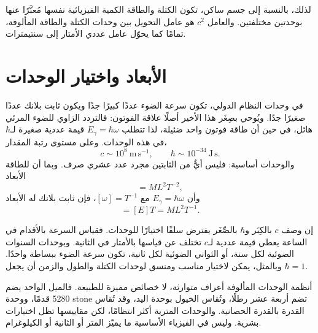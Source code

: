 لذلك، بالنسبة إلى جسم ساكن، تكون الكتلة والطاقة الكمية الفيزيائية نفسها مُعبَّرًا عنها بوحدتين مختلفتين. والعامل \(c^2\) هو عامل التحويل بين وحدات الكتلة والطاقة المألوفة، تمامًا كما يحوّل عامل عددي الأمتار إلى سنتيمترات.

\begin{classroomqa}
\end{classroomqa}

\section{الأبعاد واختيار الوحدات}

في وحدات النظام الدولي، تكون سرعة الضوء عددًا كبيرًا جدًا ويكون ثابت بلانك عددًا صغيرًا جدًا. ويُوحي بصِغَر هذا الأخير أصلًا علاقة الفوتون: فالتردد الزاوي للضوء المرئي هائل، في حين أن طاقة فوتون واحد ضئيلة، لذا تتطلب \(E_\gamma=\hbar\omega\) قيمة عددية صغيرة لـ\(\hbar\) في هذه الوحدات. وعلى مستوى رتبة المقدار،
\begin{equation}
c\sim 10^8\ \mathrm{m\,s^{-1}},
\qquad
\hbar\sim 10^{-34}\ \mathrm{J\,s}.
\end{equation}
والوحدات أساسية: فليس أيٌّ من الثابتين مجرد عدد عشري صرف. وبما أن للطاقة الأبعاد
\begin{equation}
[E]=M L^2 T^{-2},
\end{equation}
وأن \(E_\gamma=\hbar\omega\) مع \([\omega]=T^{-1}\)، فإن ثابت بلانك له الأبعاد
\begin{equation}
[\hbar]=[E]T=M L^2 T^{-1}.
\end{equation}

إن وصف \(c\) بالكِبَر و\(\hbar\) بالصِّغَر يفترض سلفًا اختيارًا للوحدات. فقياس السرعة بالأقدام في الساعة يعطي قيمة عددية لـ\(c\) تختلف عن قياسها بالأمتار في الثانية. وبوحدات السنوات الضوئية لكل سنة، أو الثواني الضوئية لكل ثانية، تكون سرعة الضوء ببساطة واحدًا. وبالمثل، يمكن لاختيار مناسب ومنسق لوحدات الكتلة والطول والزمن أن يجعل \(\hbar=1\).

أنظمة الوحدات المألوفة أعراف متوارثة، لا خصائص مميزة للطبيعة. فالميل الواحد يضم 5280 قدمًا، ووحدة stone تضم أربعة عشر رطلًا، وتُقاس الخيول بوحدة اليد، وقد تُقاس القدرة بالقدرة الحصانية. والوحدات المترية أكثر انتظامًا، لكن مقاييسها تظل اختيارات بشرية. وليس في الفيزياء الأساسية ما يميّز المتر أو الثانية أو الكيلوغرام.

